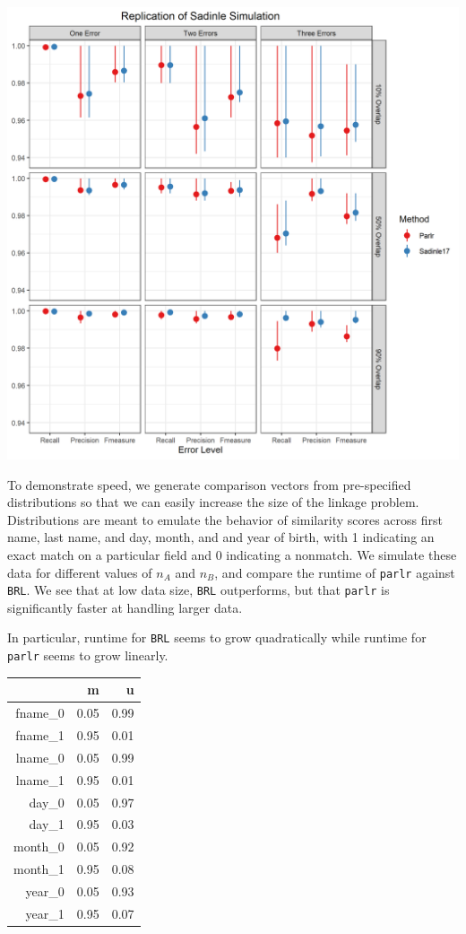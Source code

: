 \documentclass[
  12pt,
]{article}
\begin{document}
\begin{center}\includegraphics[width=29.17in]{../notes/figures/sadinle_sim_plot} \end{center}

To demonstrate speed, we generate comparison vectors from pre-specified
distributions so that we can easily increase the size of the linkage
problem. Distributions are meant to emulate the behavior of similarity
scores across first name, last name, and day, month, and and year of
birth, with 1 indicating an exact match on a particular field and 0
indicating a nonmatch. We simulate these data for different values of
\(n_A\) and \(n_B\), and compare the runtime of \texttt{parlr} against
\texttt{BRL}. We see that at low data size, \texttt{BRL} outperforms,
but that \texttt{parlr} is significantly faster at handling larger data.

In particular, runtime for \texttt{BRL} seems to grow quadratically
while runtime for \texttt{parlr} seems to grow linearly.

\begin{table}[ht]
\centering
\begin{tabular}{rrr}
  \hline
 & m & u \\ 
  \hline
fname\_0 & 0.05 & 0.99 \\ 
  fname\_1 & 0.95 & 0.01 \\ 
  lname\_0 & 0.05 & 0.99 \\ 
  lname\_1 & 0.95 & 0.01 \\ 
  day\_0 & 0.05 & 0.97 \\ 
  day\_1 & 0.95 & 0.03 \\ 
  month\_0 & 0.05 & 0.92 \\ 
  month\_1 & 0.95 & 0.08 \\ 
  year\_0 & 0.05 & 0.93 \\ 
  year\_1 & 0.95 & 0.07 \\ 
   \hline
\end{tabular}
\end{table}
\end{document}
